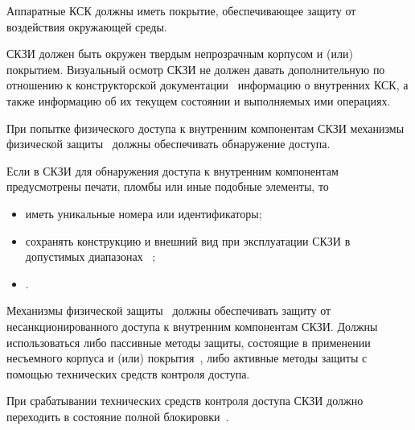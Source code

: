 \label{R.PS.Passivation}
Аппаратные КСК должны иметь покрытие, обеспечивающее защиту от 
 воздействия окружающей среды. 

\begin{note}
\end{note}


\label{R.PS.Coating}
СКЗИ должен быть окружен твердым непрозрачным корпусом и (или) покрытием.
%
Визуальный осмотр СКЗИ не должен давать дополнительную по отношению 
к конструкторской документации~ информацию о внутренних 
КСК, а также информацию об их текущем состоянии и выполняемых ими 
операциях.


\label{R.PS.PassiveDetection}
При попытке физического доступа к внутренним компонентам СКЗИ механизмы 
физической защиты~ должны обеспечивать обнаружение доступа. 

\label{R.PS.PassiveDetectionId}
Если в СКЗИ для обнаружения доступа к внутренним компонентам предусмотрены 
печати, пломбы или иные подобные элементы, то
\begin{itemize}
\item
{} 
иметь уникальные номера или идентификаторы;
\item
{}
сохранять конструкцию и внешний вид при эксплуатации СКЗИ в допустимых 
диапазонах ~;
\item
{}.
\end{itemize}


\label{R.PS.ActiveDetectionSensor}
Механизмы физической защиты~ должны обеспечивать 
защиту от несанкционированного доступа к внутренним компонентам
СКЗИ. 
%
Должны использоваться либо пассивные методы защиты, состоящие в применении 
несъемного корпуса и (или) покрытия~, либо 
активные методы защиты с помощью технических средств контроля доступа.

\label{R.PS.Erasing}
При срабатывании технических средств контроля доступа СКЗИ должно 
переходить в состояние полной блокировки~.
%

